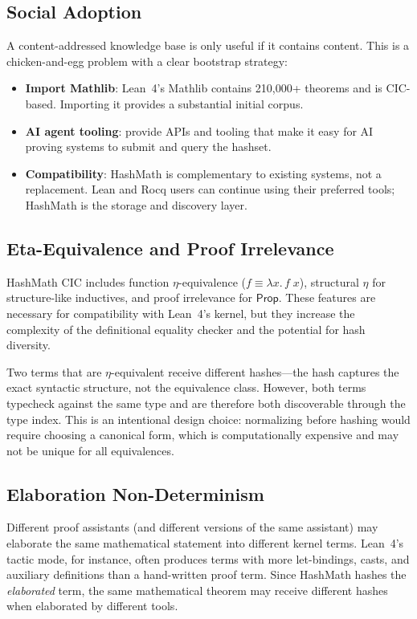 \documentclass[11pt]{article}
\theoremstyle{definition}
\theoremstyle{plain}
\theoremstyle{remark}
\newcommand{\Prop}{\textsf{Prop}}
\begin{document}
\subsection{Social Adoption}
\label{sec:adoption}

A content-addressed knowledge base is only useful if it contains content.
This is a chicken-and-egg problem with a clear bootstrap strategy:
\begin{itemize}[nosep]
  \item \textbf{Import Mathlib}: Lean~4's Mathlib contains 210,000+ theorems and is CIC-based.
    Importing it provides a substantial initial corpus.
  \item \textbf{AI agent tooling}: provide APIs and tooling that make it easy for AI proving
    systems to submit and query the hashset.
  \item \textbf{Compatibility}: HashMath is complementary to existing systems, not a replacement.
    Lean and Rocq users can continue using their preferred tools; HashMath is the storage and
    discovery layer.
\end{itemize}

\subsection{Eta-Equivalence and Proof Irrelevance}
\label{sec:eta-challenges}

HashMath CIC includes function $\eta$-equivalence ($f \equiv \lambda x.\, f\;x$),
structural $\eta$ for structure-like inductives, and proof irrelevance for $\Prop$.
These features are necessary for compatibility with Lean~4's kernel, but they increase
the complexity of the definitional equality checker and the potential for hash diversity.

Two terms that are $\eta$-equivalent receive different hashes---the hash captures the
exact syntactic structure, not the equivalence class.
However, both terms typecheck against the same type and are therefore both discoverable
through the type index.
This is an intentional design choice: normalizing before hashing would require choosing
a canonical form, which is computationally expensive and may not be unique
for all equivalences.

\subsection{Elaboration Non-Determinism}
\label{sec:elaboration}

Different proof assistants (and different versions of the same assistant) may elaborate
the same mathematical statement into different kernel terms.
Lean~4's tactic mode, for instance, often produces terms with more let-bindings, casts,
and auxiliary definitions than a hand-written proof term.
Since HashMath hashes the \emph{elaborated} term, the same mathematical theorem may receive
different hashes when elaborated by different tools.
\end{document}
